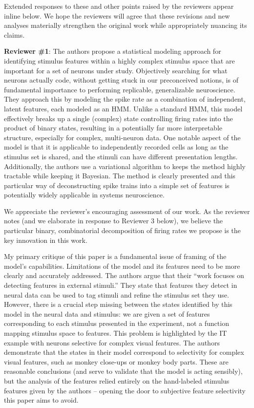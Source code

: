 \documentclass[12pt,a4paper]{article}
\newcommand{\edit}[1]{\textcolor{edit}{#1}}
\begin{document}
\edit{
Extended responses to these and other points raised by the reviewers appear inline below. We hope the reviewers will agree that these revisions and new analyses materially strengthen the original work while appropriately nuancing its claims.
}

{\bf Reviewer \#1}: The authors propose a statistical modeling approach for identifying stimulus features within a highly complex stimulus space that are important for a set of neurons under study. Objectively searching for what neurons actually code, without getting stuck in our preconceived notions, is of fundamental importance to performing replicable, generalizable neuroscience. They approach this by modeling the spike rate as a combination of independent, latent features, each modeled as an HMM. Unlike a standard HMM, this model effectively breaks up a single (complex) state controlling firing rates into the product of binary states, resulting in a potentially far more interpretable structure, especially for complex, multi-neuron data. One notable aspect of the model is that it is applicable to independently recorded cells as long as the stimulus set is shared, and the stimuli can have different presentation lengths. Additionally, the authors use a variational algorithm to keeps the method highly tractable while keeping it Bayesian. The method is clearly presented and this particular way of deconstructing spike trains into a simple set of features is potentially widely applicable in systems neuroscience.

\edit{We appreciate the reviewer's encouraging assessment of our work. As the reviewer notes (and we elaborate in response to Reviewer 3 below), we believe the particular binary, combinatorial decomposition of firing rates we propose is the key innovation in this work.}

My primary critique of this paper is a fundamental issue of framing of the model’s capabilities. Limitations of the model and its features need to be more clearly and accurately addressed. The authors argue that their “work focuses on detecting features in external stimuli.” They state that features they detect in neural data can be used to tag stimuli and refine the stimulus set they use. However, there is a crucial step missing between the states identified by this model in the neural data and stimulus: we are given a set of features corresponding to each stimulus presented in the experiment, not a function mapping stimulus space to features. This problem is highlighted by the IT example with neurons selective for complex visual features. The authors demonstrate that the states in their model correspond to selectivity for complex visual features, such as monkey close-ups or monkey body parts. These are reasonable conclusions (and serve to validate that the model is acting sensibly), but the analysis of the features relied entirely on the hand-labeled stimulus features given by the authors – opening the door to subjective feature selectivity this paper aims to avoid.
\end{document}

